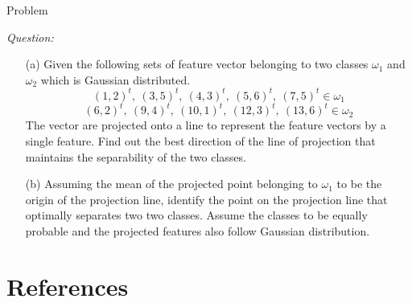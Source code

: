 \begin{frame}{Problem}
\begin{footnotesize}
\textit{\color{mycolor2}Question:}
\begin{itemize}
\item[(a)] Given the following sets of feature vector belonging to two classes $\omega_1$ and $\omega_2$ which is Gaussian distributed.
\begin{equation}
(1,2)^t,~(3,5)^t,~(4,3)^t,~(5,6)^t, ~(7,5)^t \in \omega_1 \nonumber
\end{equation}
\begin{equation}
(6,2)^t,~(9,4)^t,~(10,1)^t,~(12,3)^t, ~(13,6)^t \in \omega_2 \nonumber
\end{equation}
The vector are projected onto a line to represent the feature vectors by a single feature. Find out the best direction of the line of projection that maintains the separability of the two classes.\\
\item[(b)] Assuming the mean of the projected point belonging to $\omega_1$ to be the origin of the projection line, identify the point on the projection line that optimally separates two two classes. Assume the classes to be equally probable and the projected features also follow Gaussian distribution.
\end{itemize}
\end{footnotesize}
\end{frame}

\section{References}
